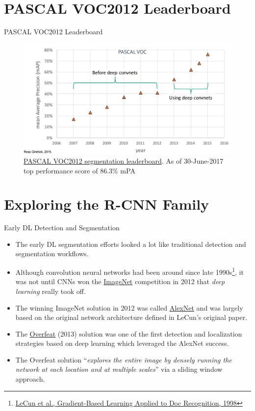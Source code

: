 \documentclass[handout]{beamer}
\begin{document}
\section{PASCAL VOC2012 Leaderboard}
\begin{frame}{PASCAL VOC2012 Leaderboard}
\begin{figure}
\centering
\includegraphics[width=\textwidth]{../media/dl_perf_pascal.png}
\caption{\href{http://host.robots.ox.ac.uk:8080/leaderboard/displaylb.php?challengeid=11&compid=6}{\color{blue}PASCAL VOC2012 segmentation leaderboard}.  As of 30-June-2017 top performance score of 86.3\% mPA }
\end{figure}
\end{frame}

\section{Exploring the R-CNN Family}

\begin{frame}{Early DL Detection and Segmentation}
\begin{itemize}
	\item<1->The early DL segmentation efforts looked a lot like traditional detection and segmentation workflows.
	\item<2->Although convolution neural networks had been around since late 1990s\footnote{\href{http://www.dengfanxin.cn/wp-content/uploads/2016/03/1998Lecun.pdf}{\color{blue}LeCun et al., Gradient-Based Learning Applied to Doc Recognition, 1998}}, it was not until CNNs won the \href{http://www.image-net.org}{\color{blue}ImageNet} competition in 2012 that \emph{deep learning} really took off.  
	\item<3->The winning ImageNet solution in 2012 was called \href{https://papers.nips.cc/paper/4824-imagenet-classification-with-deep-convolutional-neural-networks}{\color{blue}AlexNet} and was largely based on the original network architecture defined in LeCun's original paper.  
	\item<4->The \href{https://arxiv.org/abs/1312.6229}{\color{blue}Overfeat} (2013) solution was one of the first detection and localization strategies based on deep learning which leveraged the AlexNet success.
	\item<5->The Overfeat solution \enquote{\emph{explores the entire image by densely running the network at each location and at multiple scales}} via a sliding window approach.
\end{itemize}
\end{frame}
\end{document}
